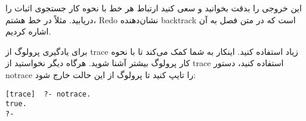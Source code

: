 این خروجی را بدقت بخوانید و سعی کنید ارتباط هر خط با نحوه کار جستجوی اثبات را دریابید. مثلاً در خط هشتم، Redo نشان‌دهنده backtrack است که در متن فصل به آن اشاره کردیم.

برای یادگیری پرولوگ از trace زیاد استفاده کنید. اینکار به شما کمک می‌کند تا با نحوه کار پرولوگ بیشتر آشنا شوید. هرگاه دیگر نخواستید از trace استفاده کنید، دستور notrace را تایپ کنید تا پرولوگ از این حالت خارج شود:

\begin{latin}
\begin{lstlisting}
[trace]  ?- notrace.
true.
?-
\end{lstlisting}
\end{latin}